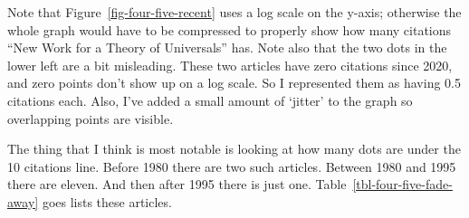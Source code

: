 \documentclass[
  10pt,
  letterpaper,
  DIV=11,
  numbers=noendperiod,
  twoside]{scrartcl}
\begin{document}
Note that Figure~\ref{fig-four-five-recent} uses a log scale on the
y-axis; otherwise the whole graph would have to be compressed to
properly show how many citations ``New Work for a Theory of Universals''
has. Note also that the two dots in the lower left are a bit misleading.
These two articles have zero citations since 2020, and zero points don't
show up on a log scale. So I represented them as having 0.5 citations
each. Also, I've added a small amount of `jitter' to the graph so
overlapping points are visible.

The thing that I think is most notable is looking at how many dots are
under the 10 citations line. Before 1980 there are two such articles.
Between 1980 and 1995 there are eleven. And then after 1995 there is
just one. Table~\ref{tbl-four-five-fade-away} goes lists these articles.
\end{document}
